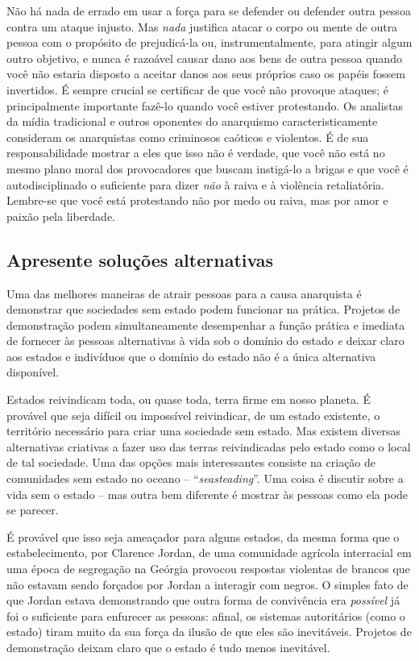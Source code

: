 Não há nada de errado em usar a força para se defender ou defender outra pessoa contra um ataque injusto. Mas \emph{nada} justifica atacar o corpo ou mente de outra pessoa com o propósito de prejudicá-la ou, instrumentalmente, para atingir algum outro objetivo, e nunca é razoável causar dano aos bens de outra pessoa quando você não estaria disposto a aceitar danos aos seus próprios caso os papéis fossem invertidos. É sempre crucial se certificar de que você não provoque ataques; é principalmente importante fazê-lo quando você estiver protestando. Os analistas da mídia tradicional e outros oponentes do anarquismo caracteristicamente consideram os anarquistas como criminosos caóticos e violentos. É de sua responsabilidade mostrar a eles que isso não é verdade, que você não está no mesmo plano moral dos provocadores que buscam instigá-lo a brigas e que você é autodisciplinado o suficiente para dizer \emph{não} à raiva e à violência retaliatória. Lembre-se que você está protestando não por medo ou raiva, mas por amor e paixão pela liberdade.

\subsection*{Apresente soluções alternativas}

Uma das melhores maneiras de atrair pessoas para a causa anarquista é demonstrar que sociedades sem estado podem funcionar na prática. Projetos de demonstração podem simultaneamente desempenhar a função prática e imediata de fornecer às pessoas alternativas à vida sob o domínio do estado \emph{e} deixar claro aos estados e indivíduos que o domínio do estado não é a única alternativa disponível.

Estados reivindicam toda, ou quase toda, terra firme em nosso planeta. É provável que seja difícil ou impossível reivindicar, de um estado existente, o território necessário para criar uma sociedade sem estado. Mas existem diversas alternativas criativas a fazer uso das terras reivindicadas pelo estado como o local de tal sociedade. Uma das opções mais interessantes consiste na criação de comunidades sem estado no oceano -- ``\emph{seasteading}''. Uma coisa é discutir sobre a vida sem o estado -- mas outra bem diferente é mostrar às pessoas como ela pode se parecer.

É provável que isso seja ameaçador para alguns estados, da mesma forma que o estabelecimento, por Clarence Jordan, de uma comunidade agrícola interracial em uma época de segregação na Geórgia provocou respostas violentas de brancos que não estavam sendo forçados por Jordan a interagir com negros. O simples fato de que Jordan estava demonstrando que outra forma de convivência era \emph{possível} já foi o suficiente para enfurecer as pessoas: afinal, os sistemas autoritários (como o estado) tiram muito da sua força da ilusão de que eles são inevitáveis. Projetos de demonstração deixam claro que o estado é tudo menos inevitável.

